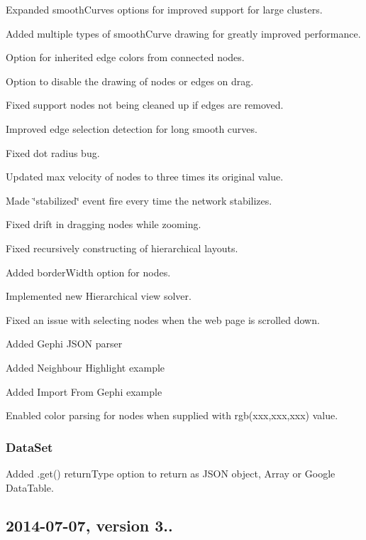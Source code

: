 \begin{DoxyItemize}
\item Expanded smooth\+Curves options for improved support for large clusters.
\item Added multiple types of smooth\+Curve drawing for greatly improved performance.
\item Option for inherited edge colors from connected nodes.
\item Option to disable the drawing of nodes or edges on drag.
\item Fixed support nodes not being cleaned up if edges are removed.
\item Improved edge selection detection for long smooth curves.
\item Fixed dot radius bug.
\item Updated max velocity of nodes to three times it\textquotesingle{}s original value.
\item Made \char`\"{}stabilized\char`\"{} event fire every time the network stabilizes.
\item Fixed drift in dragging nodes while zooming.
\item Fixed recursively constructing of hierarchical layouts.
\item Added border\+Width option for nodes.
\item Implemented new Hierarchical view solver.
\item Fixed an issue with selecting nodes when the web page is scrolled down.
\item Added Gephi J\+S\+ON parser
\item Added Neighbour Highlight example
\item Added Import From Gephi example
\item Enabled color parsing for nodes when supplied with rgb(xxx,xxx,xxx) value.
\end{DoxyItemize}

\subsubsection*{Data\+Set}


\begin{DoxyItemize}
\item Added .get() return\+Type option to return as J\+S\+ON object, Array or Google Data\+Table.
\end{DoxyItemize}

\subsection*{2014-\/07-\/07, version 3..}

